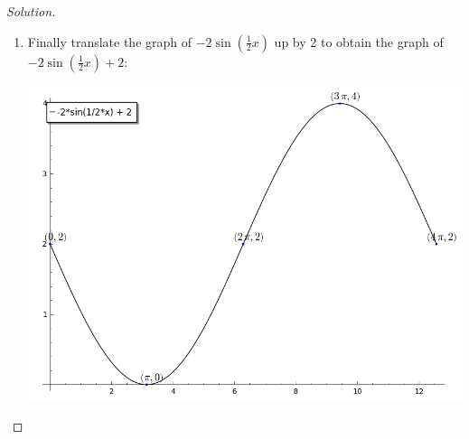 \documentclass[12pt]{amsart}
\begin{document}
\begin{thm}[20 Points]
\begin{proof}[Solution]
\begin{enumerate}
    \item
      Finally translate the graph of $-2\sin\left(\frac{1}{2}x\right)$ up by 2 to obtain the graph of $-2\sin\left(\frac{1}{2}x\right) + 2$:
      \begin{center}
        \includegraphics[scale=0.5]{sin/p_4}
      \end{center}
    \end{enumerate}
  \end{proof}
\end{thm}
\end{document}
